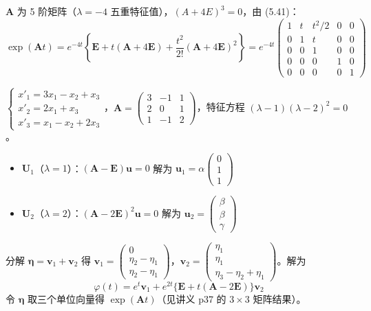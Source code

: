 \begin{example}
$\mathbf{A}$ 为 5 阶矩阵（$\lambda = -4$ 五重特征值），$(A+4E)^3 = 0$，由 (5.41)：
$$\exp(\mathbf{A}t) = e^{-4t}\left\{\mathbf{E} + t(\mathbf{A}+4\mathbf{E}) + \frac{t^2}{2!}(\mathbf{A}+4\mathbf{E})^2\right\} = e^{-4t}\begin{pmatrix} 1 & t & t^2/2 & 0 & 0 \\ 0 & 1 & t & 0 & 0 \\ 0 & 0 & 1 & 0 & 0 \\ 0 & 0 & 0 & 1 & 0 \\ 0 & 0 & 0 & 0 & 1 \end{pmatrix}$$
\end{example}

\begin{example}
$\begin{cases} x'_1 = 3x_1 - x_2 + x_3 \\ x'_2 = 2x_1 + x_3 \\ x'_3 = x_1 - x_2 + 2x_3 \end{cases}$，$\mathbf{A} = \begin{pmatrix} 3 & -1 & 1 \\ 2 & 0 & 1 \\ 1 & -1 & 2 \end{pmatrix}$，特征方程 $(\lambda-1)(\lambda-2)^2 = 0$。
\begin{itemize}
    \item $\mathbf{U}_1$（$\lambda=1$）：$(\mathbf{A}-\mathbf{E})\mathbf{u} = 0$ 解为 $\mathbf{u}_1 = \alpha\begin{pmatrix}0\\1\\1\end{pmatrix}$
    \item $\mathbf{U}_2$（$\lambda=2$）：$(\mathbf{A}-2\mathbf{E})^2\mathbf{u} = 0$ 解为 $\mathbf{u}_2 = \begin{pmatrix}\beta\\\beta\\\gamma\end{pmatrix}$
\end{itemize}
分解 $\boldsymbol{\eta} = \mathbf{v}_1 + \mathbf{v}_2$ 得 $\mathbf{v}_1 = \begin{pmatrix}0\\\eta_2-\eta_1\\\eta_2-\eta_1\end{pmatrix}$，$\mathbf{v}_2 = \begin{pmatrix}\eta_1\\\eta_1\\\eta_3-\eta_2+\eta_1\end{pmatrix}$。解为
$$\varphi(t) = e^t\mathbf{v}_1 + e^{2t}\{\mathbf{E} + t(\mathbf{A}-2\mathbf{E})\}\mathbf{v}_2$$
令 $\boldsymbol{\eta}$ 取三个单位向量得 $\exp(\mathbf{A}t)$（见讲义 p37 的 $3\times3$ 矩阵结果）。
\end{example}

